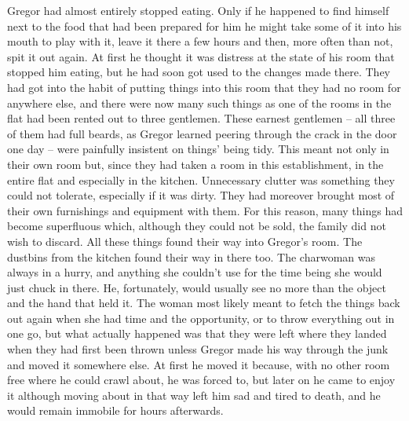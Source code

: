 Gregor had almost entirely stopped eating. Only if he happened to find
himself next to the food that had been prepared for him he might take
some of it into his mouth to play with it, leave it there a few hours
and then, more often than not, spit it out again. At first he thought
it was distress at the state of his room that stopped him eating, but
he had soon got used to the changes made there. They had got into the
habit of putting things into this room that they had no room for
anywhere else, and there were now many such things as one of the rooms
in the flat had been rented out to three gentlemen. These earnest
gentlemen – all three of them had full beards, as Gregor learned peering
through the crack in the door one day – were painfully insistent on
things’ being tidy. This meant not only in their own room but, since
they had taken a room in this establishment, in the entire flat and
especially in the kitchen. Unnecessary clutter was something they could
not tolerate, especially if it was dirty. They had moreover brought
most of their own furnishings and equipment with them. For this reason,
many things had become superfluous which, although they could not be
sold, the family did not wish to discard. All these things found their
way into Gregor’s room. The dustbins from the kitchen found their way
in there too. The charwoman was always in a hurry, and anything she
couldn’t use for the time being she would just chuck in there. He,
fortunately, would usually see no more than the object and the hand
that held it. The woman most likely meant to fetch the things back out
again when she had time and the opportunity, or to throw everything out
in one go, but what actually happened was that they were left where
they landed when they had first been thrown unless Gregor made his way
through the junk and moved it somewhere else. At first he moved it
because, with no other room free where he could crawl about, he was
forced to, but later on he came to enjoy it although moving about in
that way left him sad and tired to death, and he would remain immobile
for hours afterwards.

